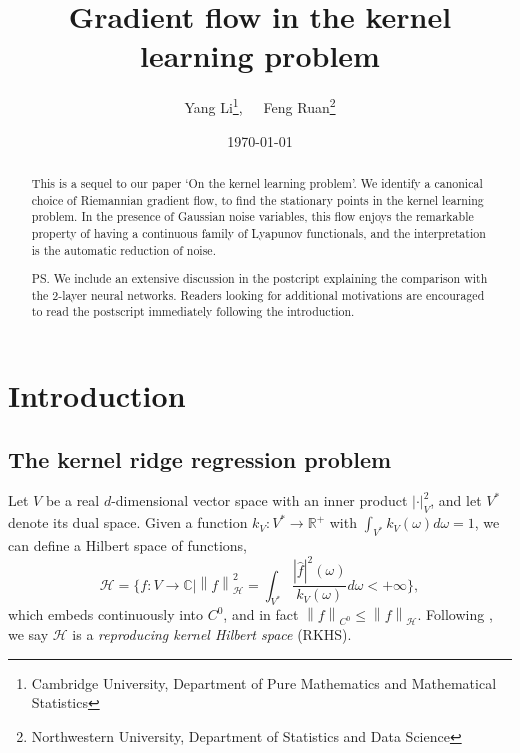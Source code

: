 \documentclass[a4paper]{article}
\title{Gradient flow in the kernel learning problem}
\author{Yang Li\footnote{Cambridge University, Department of Pure Mathematics and Mathematical Statistics},~~~Feng Ruan\footnote{Northwestern University, Department of Statistics and Data Science}}
\date{\today}
\theoremstyle{definition}
\newcommand{\R}{\mathbb{R}}
\newcommand{\C}{\mathbb{C}}
\newcommand{\norm}[1]{\left\lVert#1\right\rVert}
\newcommand{\1}{\mathbbm{1}}
\begin{document}
	\maketitle
	
	
	
	\begin{abstract}
		This is a sequel to our paper `On the kernel learning problem'. We identify a canonical choice of Riemannian gradient flow, to find the stationary points in the kernel learning problem. In the presence of Gaussian noise variables, this flow enjoys the remarkable property of having a continuous family of Lyapunov functionals, and the interpretation is the automatic reduction of noise. 
		
		PS. We include an extensive discussion in the postcript explaining the comparison with the 2-layer neural networks. Readers looking for additional motivations are encouraged to read the postscript immediately following the introduction.
	\end{abstract}
	
	
	
	
	\section{Introduction}
	
	
	
	
	
	\subsection{The kernel ridge regression problem}
	
	
	
	
	
	Let $V$ be a real $d$-dimensional  vector space with an inner product $|\cdot|_V^2$, and let $V^*$ denote its dual space. Given a function $k_V: V^*\to \R^+$ with $\int_{V^*} k_V(\omega)d\omega=1$, we can define a Hilbert space of functions,
	\[
	\mathcal{H}=\{  f: V\to \C| \norm{f}_{\mathcal{H}}^2= \int_{V^*} \frac{ |\hat{f}|^2(\omega)}{ k_V(\omega) }d\omega<+\infty\}, 
	\]
	which embeds continuously into $C^0$, and in fact $\norm{f}_{C^0}\leq \norm{f}_{\mathcal{H}}$. Following \cite{Smale}\cite{Aronszajn},
	we say $\mathcal{H}$ is a \emph{reproducing kernel Hilbert space} (RKHS).
	
	
	
	
	
	
	
	
	
\end{document}
